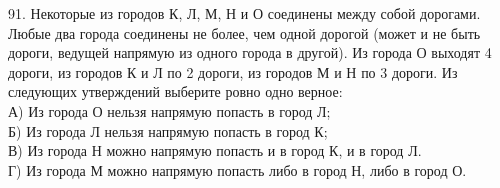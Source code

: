 91. Некоторые из городов К, Л, М, Н и О соединены между собой дорогами. Любые два города соединены не более, чем одной дорогой (может и не быть дороги, ведущей напрямую из одного города в другой). Из города О выходят 4 дороги, из городов К и Л по 2 дороги, из городов М и Н по 3 дороги. Из следующих утверждений выберите ровно одно верное:\\
А) Из города О нельзя напрямую попасть в город Л;\\
Б) Из города Л нельзя напрямую попасть в город К;\\
В) Из города Н можно напрямую попасть и в город К, и в город Л.\\
Г) Из города М можно напрямую попасть либо в город Н, либо в город О.\\
